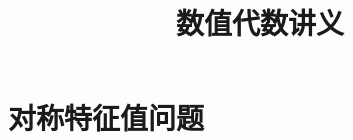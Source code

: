 \documentclass{book}
\begin{document}
\title{数值代数讲义}
\maketitle

\chapter{对称特征值问题}


\cite{stein2003}


\end{document}
